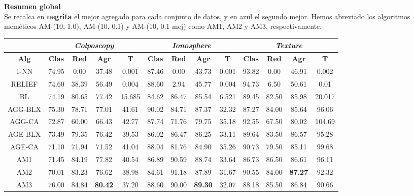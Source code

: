 \documentclass[12pt]{article}
\begin{document}
\textbf{Resumen global}\\

Se recalca en \textbf{negrita} el mejor agregado para cada conjunto de datos, y en {\color{blue} azul} el segundo mejor. Hemos abreviado los algoritmos meméticos AM-(10, 1.0), AM-(10, 0.1) y AM-(10, 0.1 mej) como AM1, AM2 y AM3, respectivamente. 

\begin{table}[h]
\begin{tabular}{ccccc|cccc|cccc}
\centering
 & \multicolumn{4}{c}{\textit{Colposcopy}} & \multicolumn{4}{c}{\textit{Ionosphere}} & \multicolumn{4}{c}{\textit{Texture}} \\ \hline
\textbf{Alg} & \textbf{Clas} & \textbf{Red} & \textbf{Agr} & \textbf{T} & \textbf{Clas} & \textbf{Red} & \textbf{Agr} & \textbf{T} & \textbf{Clas} & \textbf{Red} & \textbf{Agr} & \textbf{T} \\ \hline
1-NN & 74.95 & 0.00 & 37.48 & 0.001 & 87.46 & 0.00 & 43.73 & 0.001 & 93.82 & 0.00 & 46.91 & 0.002\\
RELIEF & 74.60 & 38.39 & 56.49 & 0.004 & 88.60 & 2.94 & 45.77 & 0.004 & 94.73 & 6.50 & 50.61 & 0.01\\
BL & 74.19 & 80.65 & 77.42 & 15.685 & 84.62 & 86.47 & 85.54 & 6.521 & 89.45 & 82.50 & 85.98 & 20.017\\
AGG-BLX & 75.30 & 78.71 & 77.01 & 41.61 & 90.02 & 84.71 & 87.37 & 32.32  & 87.27 & 84.00 & 85.64 & 96.06 \\
AGG-CA & 72.87 & 60.00 & 66.43 & 42.77 & 87.74 & 71.76 & 79.75 & 35.18 & 92.55 & 67.50 & 80.02 & 104.69 \\
AGE-BLX & 73.49 & 79.35 & 76.42 & 39.53 & 86.02 & 86.47 & 86.25 & 33.11 & 89.64 & 83.50 & 86.57 & 95.28 \\
AGE-CA & 71.10 & 71.94 & 71.52 & 41.04 & 88.04 & 81.76 & 84.90 & 35.26 & 90.73 & 79.50 & 85.11 & 99.68 \\
AM1 & 71.45 & 84.19 & {\color{blue}77.82} & 40.54 & 86.89 & 90.59 & {\color{blue}88.74} & 33.64 & 86.73 & 86.50 & 86.61 & 96.11 \\
AM2 & 70.01 & 83.23 & 76.62 & 38.98 & 84.61 & 91.18 & 87.89 & 31.67 & 90.55 & 84.00 & \textbf{87.27} & 92.32 \\
AM3 & 76.00 & 84.84 & \textbf{80.42} & 37.20 & 88.60 & 90.00 & \textbf{89.30} & 32.07 & 88.18 & 85.50 & {\color{blue}86.84} & 90.66 \\
\end{tabular}
\end{table}
\end{document}
